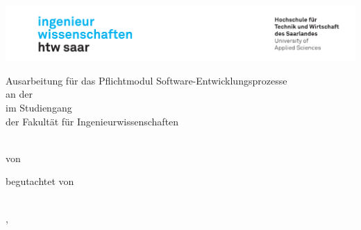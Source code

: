 \begin{titlepage}\linespread{1.5}\selectfont
\includegraphics[width=\linewidth]{Graphics/htwsaar_Logo_inwi_head_VF_4C_crop}
  \begin{center}
    \large  
    \hfill
    \vfill
		
		\bigskip
		Ausarbeitung für das Pflichtmodul
    Software-Entwicklungsprozesse \\
    
    an der \myUni \\
    im Studiengang \myDegreeCourse \\
    der Fakultät für Ingenieurwissenschaften \\ 
    
  \vfill
	
  \begingroup
    \Large\bfseries\myTitle 
  \endgroup
	
	\bigskip
	
   von \\
  \myName
	
  \vfill
	
  begutachtet von \\
  \myFirstProf \\

  \vfill
	
  \myLocation, \myTime                   

    \end{center}       
\end{titlepage}   